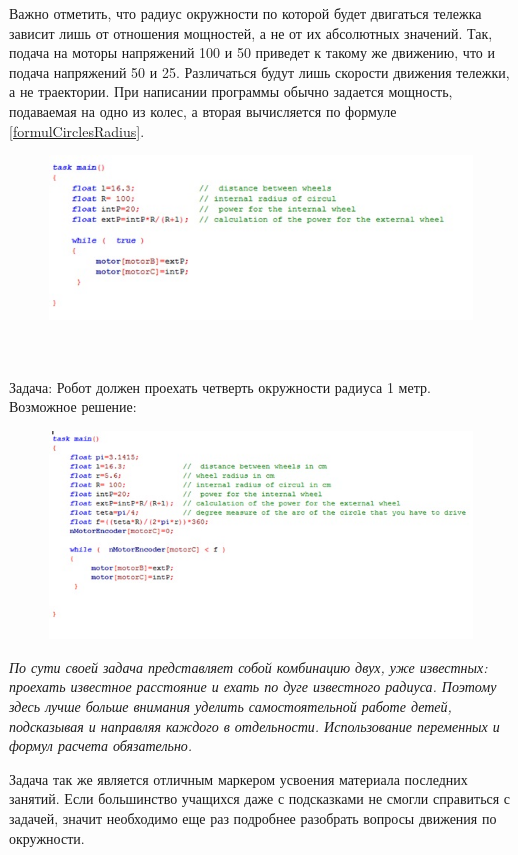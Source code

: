 Важно отметить, что радиус окружности по которой будет двигаться тележка зависит лишь от отношения мощностей, а не от их абсолютных значений. Так, подача на моторы напряжений 100 и 50 приведет к такому же движению, что и подача напряжений 50 и 25. Различаться будут лишь скорости движения тележки, а не траектории.
При написании программы обычно задается мощность, подаваемая на одно из колес, а вторая вычисляется по формуле \ref{formulCirclesRadius}.
\clearpage
\begin{figure}[h!]
	\begin{center}
		\includegraphics[width=0.98\linewidth]{chapters/chapter12/images/1}
		\caption{}
		\label{ris:image12x1}
	\end{center}
\end{figure}

{\hypertarget{lesson1232}{}}\\\\	
Задача: Робот должен проехать четверть окружности радиуса 1 метр.\\
Возможное решение:

\begin{figure}[h!]
	\begin{center}
		\includegraphics[width=0.98\linewidth]{chapters/chapter12/images/2}
		\caption{}
		\label{ris:image12x2}
	\end{center}
\end{figure}	

{\slshape По сути своей задача представляет собой комбинацию двух, уже известных: проехать известное расстояние и ехать по дуге известного радиуса. Поэтому здесь лучше больше внимания уделить самостоятельной работе детей, подсказывая и направляя каждого в отдельности. Использование переменных и формул расчета обязательно.
	
Задача так же является отличным маркером усвоения материала последних занятий. Если большинство учащихся даже с подсказками не смогли справиться с задачей, значит необходимо еще раз подробнее разобрать вопросы движения по окружности.}